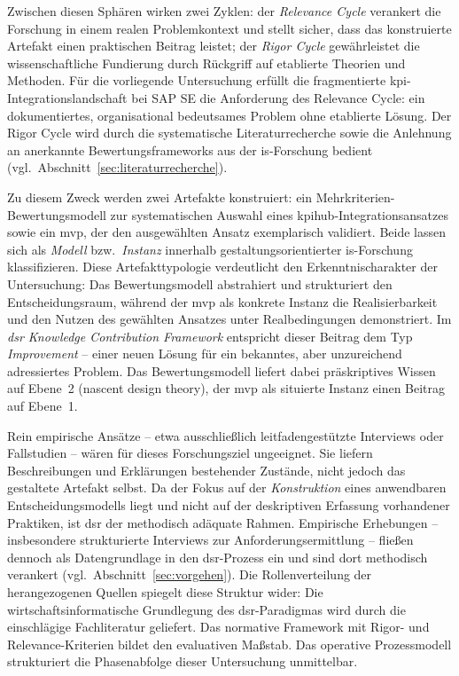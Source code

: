 Zwischen diesen Sphären wirken zwei Zyklen: der \textit{Relevance Cycle} verankert die Forschung in einem realen Problemkontext und stellt sicher, dass das konstruierte Artefakt einen praktischen Beitrag leistet; der \textit{Rigor Cycle} gewährleistet die wissenschaftliche Fundierung durch Rückgriff auf etablierte Theorien und Methoden.
Für die vorliegende Untersuchung erfüllt die fragmentierte \gls{kpi}-Integrationslandschaft bei SAP SE die Anforderung des Relevance Cycle: ein dokumentiertes, organisational bedeutsames Problem ohne etablierte Lösung.
Der Rigor Cycle wird durch die systematische Literaturrecherche sowie die Anlehnung an anerkannte Bewertungsframeworks aus der \gls{is}-Forschung bedient (vgl.\ Abschnitt~\ref{sec:literaturrecherche}).

Zu diesem Zweck werden zwei Artefakte konstruiert: ein Mehrkriterien-Bewertungsmodell zur systematischen Auswahl eines \gls{kpihub}-Integrationsansatzes sowie ein \gls{mvp}, der den ausgewählten Ansatz exemplarisch validiert.
Beide lassen sich als \textit{Modell} bzw.\ \textit{Instanz} innerhalb gestaltungsorientierter \gls{is}-Forschung klassifizieren.
Diese Artefakttypologie verdeutlicht den Erkenntnischarakter der Untersuchung: Das Bewertungsmodell abstrahiert und strukturiert den Entscheidungsraum, während der \gls{mvp} als konkrete Instanz die Realisierbarkeit und den Nutzen des gewählten Ansatzes unter Realbedingungen demonstriert.
Im \textit{\gls{dsr} Knowledge Contribution Framework} entspricht dieser Beitrag dem Typ \textit{Improvement} -- einer neuen Lösung für ein bekanntes, aber unzureichend adressiertes Problem.
Das Bewertungsmodell liefert dabei präskriptives Wissen auf Ebene~2 (nascent design theory), der \gls{mvp} als situierte Instanz einen Beitrag auf Ebene~1.

Rein empirische Ansätze -- etwa ausschließlich leitfadengestützte Interviews oder Fallstudien -- wären für dieses Forschungsziel ungeeignet.
Sie liefern Beschreibungen und Erklärungen bestehender Zustände, nicht jedoch das gestaltete Artefakt selbst.
Da der Fokus auf der \textit{Konstruktion} eines anwendbaren Entscheidungsmodells liegt und nicht auf der deskriptiven Erfassung vorhandener Praktiken, ist \gls{dsr} der methodisch adäquate Rahmen.
Empirische Erhebungen -- insbesondere strukturierte Interviews zur Anforderungsermittlung -- fließen dennoch als Datengrundlage in den \gls{dsr}-Prozess ein und sind dort methodisch verankert (vgl.\ Abschnitt~\ref{sec:vorgehen}).
Die Rollenverteilung der herangezogenen Quellen spiegelt diese Struktur wider: Die wirtschaftsinformatische Grundlegung des \gls{dsr}-Paradigmas wird durch die einschlägige Fachliteratur geliefert.
Das normative Framework mit Rigor- und Relevance-Kriterien bildet den evaluativen Maßstab.
Das operative Prozessmodell strukturiert die Phasenabfolge dieser Untersuchung unmittelbar.

